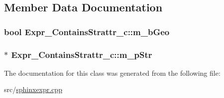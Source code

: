 \subsection{Member Data Documentation}
\hypertarget{classExpr__ContainsStrattr__c_ab6c47018657407f1572fb8c354484974}{
\subsubsection[{m\-\_\-b\-Geo}]{\setlength{\rightskip}{0pt plus 5cm}bool Expr\-\_\-\-Contains\-Strattr\-\_\-c\-::m\-\_\-b\-Geo\hspace{0.3cm}{\ttfamily [protected]}}}\label{classExpr__ContainsStrattr__c_ab6c47018657407f1572fb8c354484974}
\hypertarget{classExpr__ContainsStrattr__c_ad1da2599cb74183bd40353c305caff18}{
\subsubsection[{m\-\_\-p\-Str}]{$\ast$ Expr\-\_\-\-Contains\-Strattr\-\_\-c\-::m\-\_\-p\-Str\hspace{0.3cm}{\ttfamily [protected]}}}\label{classExpr__ContainsStrattr__c_ad1da2599cb74183bd40353c305caff18}


The documentation for this class was generated from the following file\-:\begin{DoxyCompactItemize}
\item 
src/\hyperlink{sphinxexpr_8cpp}{sphinxexpr.\-cpp}\end{DoxyCompactItemize}
